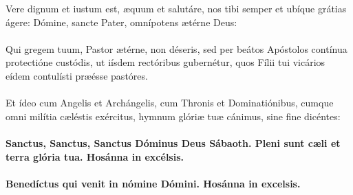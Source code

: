 \documentclass[12pt, a4paper]{article}
\begin{document}
	\\
	\\
	\\
	\\
	\\
	Vere dignum et iustum est, æquum
	et salutáre, nos tibi semper et
	ubíque grátias ágere: Dómine,
	sancte Pater, omnípotens ætérne
	Deus:
	\\\\
	Qui gregem tuum, Pastor ætérne,
	non déseris, sed per beátos
	Apóstolos contínua protectióne
	custódis, ut iísdem rectóribus
	gubernétur, quos Fílii tui vicários
	eídem contulísti præésse pastóres.
	\\\\
	Et ídeo cum Angelis et
	Archángelis, cum Thronis et
	Dominatiónibus, cumque omni
	milítia cæléstis exércitus, hymnum
	glóriæ tuæ cánimus, sine fine
	dicéntes:
	\\\\
	\textbf{Sanctus, Sanctus, Sanctus Dóminus
		Deus Sábaoth. Pleni sunt cæli et
		terra glória tua. Hosánna in
		excélsis.}
	\\\\
	\textbf{Benedíctus qui venit in nómine
		Dómini. Hosánna in excelsis.}
	
	\newpage
	
\end{document}
